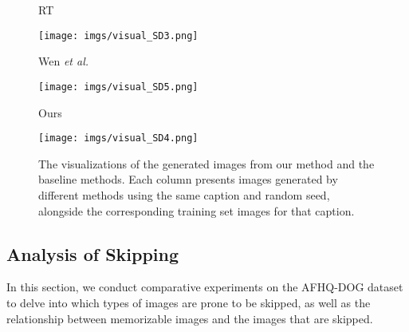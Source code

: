 \begin{figure}[t]
    \vspace{1em}
    \begin{minipage}{0.2\linewidth}
        \centering
        RT~\cite{somepalli2024understanding}
    \end{minipage}%
    \hspace{1em} %
    \begin{minipage}{0.7\linewidth}
        \centering
        \texttt{[image: imgs/visual\_SD3.png]} %
    \end{minipage}

    \vspace{1em}
    \begin{minipage}{0.2\linewidth}
        \centering
        Wen \MakeLowercase{\textit{et al.}}~\cite{wen2023detecting}
    \end{minipage}%
    \hspace{1em} %
    \begin{minipage}{0.7\linewidth}
        \centering
        \texttt{[image: imgs/visual\_SD5.png]} %
    \end{minipage}

    \vspace{1em}
    \begin{minipage}{0.2\linewidth}
        \centering
        Ours
    \end{minipage}%
    \hspace{1em} %
    \begin{minipage}{0.7\linewidth}
        \centering
        \texttt{[image: imgs/visual\_SD4.png]} %
    \end{minipage}
    \caption{The visualizations of the generated images from our method and the baseline methods. Each column presents images generated by different methods using the same caption and random seed, alongside the corresponding training set images for that caption.}
    \label{fig:Visual}
    \vspace{-1em}
\end{figure}


\subsection{Analysis of Skipping}
\label{sec:analysis}
In this section, we conduct comparative experiments on the AFHQ-DOG dataset to delve into which types of images are prone to be skipped, as well as the relationship between memorizable images and the images that are skipped.


